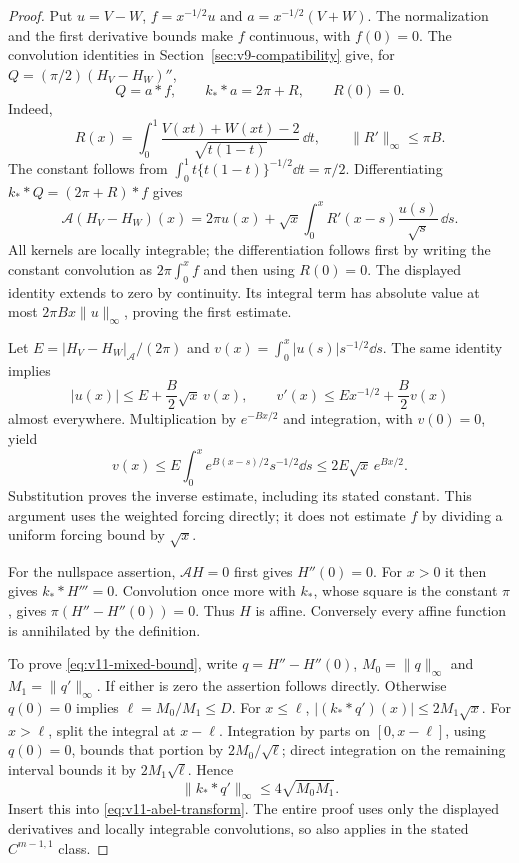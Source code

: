 \begin{proof}
Put $u=V-W$, $f=x^{-1/2}u$ and $a=x^{-1/2}(V+W)$. The
normalization and the first derivative bounds make $f$ continuous,
with $f(0)=0$. The convolution identities in
Section~\ref{sec:v9-compatibility} give, for
$Q=(\pi/2)(H_V-H_W)''$,
\[
 Q=a*f,\qquad k_* *a=2\pi+R,\qquad R(0)=0.
\]
Indeed,
\[
 R(x)=\int_0^1
       \frac{V(xt)+W(xt)-2}{\sqrt{t(1-t)}}\,\dd t,
 \qquad \|R'\|_\infty\le\pi B.
\]
The constant follows from
$\int_0^1t\{t(1-t)\}^{-1/2}\dd t=\pi/2$.
Differentiating $k_* *Q=(2\pi+R)*f$ gives
\begin{equation}\label{eq:v11-weighted-volterra}
 \mathscr A(H_V-H_W)(x)
  =2\pi u(x)+\sqrt{x}\int_0^xR'(x-s)\frac{u(s)}{\sqrt{s}}\,\dd s.
\end{equation}
All kernels are locally integrable; the differentiation follows first
by writing the constant convolution as $2\pi\int_0^x f$ and then
using $R(0)=0$. The displayed identity extends to zero by continuity.
Its integral term has absolute value at most
$2\pi Bx\|u\|_\infty$, proving the first estimate.

Let $E=|H_V-H_W|_{\mathscr A}/(2\pi)$ and
$v(x)=\int_0^x|u(s)|s^{-1/2}\dd s$. The same identity implies
\[
 |u(x)|\le E+\frac B2\sqrt{x}\,v(x),\qquad
 v'(x)\le E x^{-1/2}+\frac B2v(x)
\]
almost everywhere. Multiplication by $e^{-Bx/2}$ and integration,
with $v(0)=0$, yield
\[
 v(x)\le E\int_0^x e^{B(x-s)/2}s^{-1/2}\dd s
                       \le2E\sqrt{x}\,e^{Bx/2}.
\]
Substitution proves the inverse estimate, including its stated
constant. This argument uses the weighted forcing directly; it does
not estimate $f$ by dividing a uniform forcing bound by $\sqrt{x}$.

For the nullspace assertion, $\mathscr AH=0$ first gives $H''(0)=0$.
For $x>0$ it then gives $k_* *H'''=0$. Convolution once more with
$k_*$, whose square is the constant $\pi$, gives
$\pi(H''-H''(0))=0$. Thus $H$ is affine. Conversely every affine
function is annihilated by the definition.

To prove \eqref{eq:v11-mixed-bound}, write
$q=H''-H''(0)$, $M_0=\|q\|_\infty$ and
$M_1=\|q'\|_\infty$. If either is zero the assertion follows
directly. Otherwise $q(0)=0$ implies
$\ell=M_0/M_1\le D$. For $x\le\ell$,
$|(k_* *q')(x)|\le2M_1\sqrt{x}$. For $x>\ell$, split the
integral at $x-\ell$. Integration by parts on $[0,x-\ell]$,
using $q(0)=0$, bounds that portion by $2M_0/\sqrt\ell$;
direct integration on the remaining interval bounds it by
$2M_1\sqrt\ell$. Hence
\[
 \|k_* *q'\|_\infty\le4\sqrt{M_0M_1}.
\]
Insert this into \eqref{eq:v11-abel-transform}. The entire proof uses
only the displayed derivatives and locally integrable convolutions,
so also applies in the stated $C^{m-1,1}$ class.
\end{proof}

